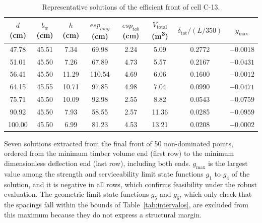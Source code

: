\begin{table}[!ht]
\caption{Representative solutions of the efficient front of cell C-13.\label{tab:solucoes_ref}}
\begin{threeparttable}
\setlength{\tabcolsep}{3pt}
\begin{tabular*}{\textwidth}{@{\extracolsep{\fill}}cccccccc@{\extracolsep{\fill}}}
\toprule
$d$ (cm) & $b_w$ (cm) & $h$ (cm) & $esp_{long}$ (cm) & $esp_{tab}$ (cm) & $V_{\mathrm{total}}$ (m\textsuperscript{3}) & $\delta_{\mathrm{tot}}/(L/350)$ & $g_{\max}$ \\
\midrule
47.78 & 45.51 & 7.34 & 69.98 & 2.24 & 5.09 & 0.2772 & $-0.0018$ \\
51.01 & 45.50 & 7.26 & 67.89 & 4.73 & 5.57 & 0.2167 & $-0.0431$ \\
56.41 & 45.50 & 11.29 & 110.54 & 4.69 & 6.06 & 0.1600 & $-0.0012$ \\
64.15 & 45.55 & 10.71 & 97.85 & 4.98 & 7.04 & 0.0990 & $-0.0471$ \\
75.71 & 45.50 & 10.09 & 92.98 & 2.55 & 8.82 & 0.0543 & $-0.0759$ \\
90.92 & 45.50 & 7.93 & 58.55 & 2.57 & 11.36 & 0.0285 & $-0.0959$ \\
100.00 & 45.50 & 6.99 & 81.23 & 4.53 & 13.21 & 0.0208 & $-0.0002$ \\
\bottomrule
\end{tabular*}
\begin{tablenotes}
\footnotesize
\item Seven solutions extracted from the final front of 50 non-dominated points, ordered from the minimum timber volume end (first row) to the minimum dimensionless deflection end (last row), including both ends. $g_{\max}$ is the largest value among the strength and serviceability limit state functions $g_1$ to $g_4$ of the solution, and it is negative in all rows, which confirms feasibility under the robust evaluation.
The geometric limit state functions $g_5$ and $g_6$, which only check that the spacings fall within the bounds of Table~\ref{tab:intervalos}, are excluded from this maximum because they do not express a structural margin.
\end{tablenotes}
\end{threeparttable}
\end{table}

